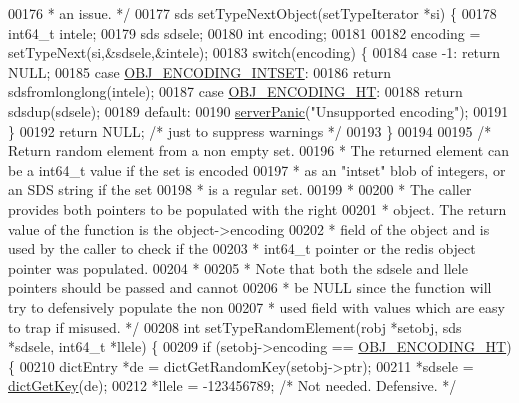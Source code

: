 \begin{DoxyCode}
00176 \textcolor{comment}{ * an issue. */}
00177 sds setTypeNextObject(setTypeIterator *si) \{
00178     int64\_t intele;
00179     sds sdsele;
00180     \textcolor{keywordtype}{int} encoding;
00181 
00182     encoding = setTypeNext(si,&sdsele,&intele);
00183     \textcolor{keywordflow}{switch}(encoding) \{
00184         \textcolor{keywordflow}{case} -1:    \textcolor{keywordflow}{return} NULL;
00185         \textcolor{keywordflow}{case} \hyperlink{server_8h_a214173987de21c3b7661fddd42b05873}{OBJ\_ENCODING\_INTSET}:
00186             \textcolor{keywordflow}{return} sdsfromlonglong(intele);
00187         \textcolor{keywordflow}{case} \hyperlink{server_8h_a9c10219f68afc557d510d108257d238b}{OBJ\_ENCODING\_HT}:
00188             \textcolor{keywordflow}{return} sdsdup(sdsele);
00189         \textcolor{keywordflow}{default}:
00190             \hyperlink{server_8h_a11cc378e7778a830b41240578de3b204}{serverPanic}(\textcolor{stringliteral}{"Unsupported encoding"});
00191     \}
00192     \textcolor{keywordflow}{return} NULL; \textcolor{comment}{/* just to suppress warnings */}
00193 \}
00194 
00195 \textcolor{comment}{/* Return random element from a non empty set.}
00196 \textcolor{comment}{ * The returned element can be a int64\_t value if the set is encoded}
00197 \textcolor{comment}{ * as an "intset" blob of integers, or an SDS string if the set}
00198 \textcolor{comment}{ * is a regular set.}
00199 \textcolor{comment}{ *}
00200 \textcolor{comment}{ * The caller provides both pointers to be populated with the right}
00201 \textcolor{comment}{ * object. The return value of the function is the object->encoding}
00202 \textcolor{comment}{ * field of the object and is used by the caller to check if the}
00203 \textcolor{comment}{ * int64\_t pointer or the redis object pointer was populated.}
00204 \textcolor{comment}{ *}
00205 \textcolor{comment}{ * Note that both the sdsele and llele pointers should be passed and cannot}
00206 \textcolor{comment}{ * be NULL since the function will try to defensively populate the non}
00207 \textcolor{comment}{ * used field with values which are easy to trap if misused. */}
00208 \textcolor{keywordtype}{int} setTypeRandomElement(robj *setobj, sds *sdsele, int64\_t *llele) \{
00209     \textcolor{keywordflow}{if} (setobj->encoding == \hyperlink{server_8h_a9c10219f68afc557d510d108257d238b}{OBJ\_ENCODING\_HT}) \{
00210         dictEntry *de = dictGetRandomKey(setobj->ptr);
00211         *sdsele = \hyperlink{dict_8h_a3271c334309904a3086deca94f96e46e}{dictGetKey}(de);
00212         *llele = -123456789; \textcolor{comment}{/* Not needed. Defensive. */}

\end{DoxyCode}
